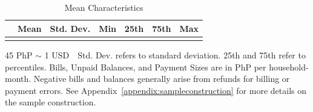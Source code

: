 \documentclass[12pt]{article}
\begin{document}
\begin{table}[h!] %
\centering
\caption{Mean Characteristics}\label{table:descriptives_all}
\vspace{-2mm}
\begin{threeparttable}
\begin{tabular}{l*{1}{cccccc}}
\toprule
 & Mean & Std. Dev. & Min &  25th & 75th & Max \\
\midrule

% 
% 
\bottomrule \\ [-.8em]
\end{tabular}
\begin{tablenotes}
\footnotesize
\item  45 PhP $\sim$ 1 USD \,\, Std. Dev. refers to standard deviation.  25th and 75th refer to percentiles.  Bills, Unpaid Balances, and Payment Sizes are in PhP per household-month.  Negative bills and balances generally arise from refunds for billing or payment errors.  See Appendix~\ref{appendix:sampleconstruction} for more details on the sample construction.
\end{tablenotes}
\end{threeparttable}
\end{table}


\end{document}
